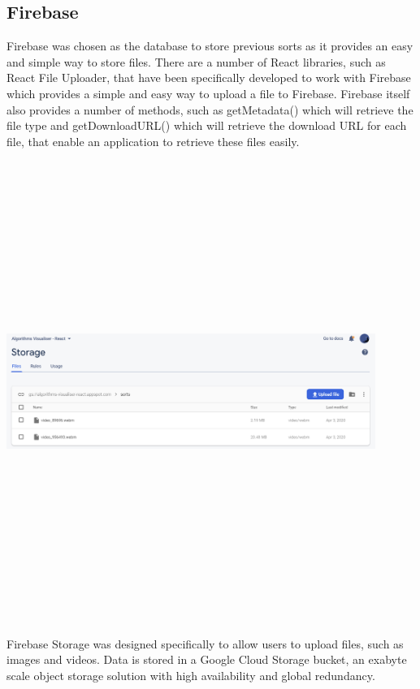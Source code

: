 \subsection{Firebase}
Firebase was chosen as the database to store previous sorts as it provides an easy and simple way to store files. There are a number of React libraries, such as React File Uploader, that have been specifically developed to work with Firebase which provides a simple and easy way to upload a file to Firebase. Firebase itself also provides a number of methods, such as getMetadata() which will retrieve the file type and getDownloadURL() which will retrieve the download URL for each file, that enable an application to retrieve these files easily.

\begin{center}
    \includegraphics[width=12cm,height=15cm,keepaspectratio]{images/firestore}
\end{center}

Firebase Storage was designed specifically to allow users to upload files, such as images and videos. Data is stored in a Google Cloud Storage bucket, an exabyte scale object storage solution with high availability and global redundancy.